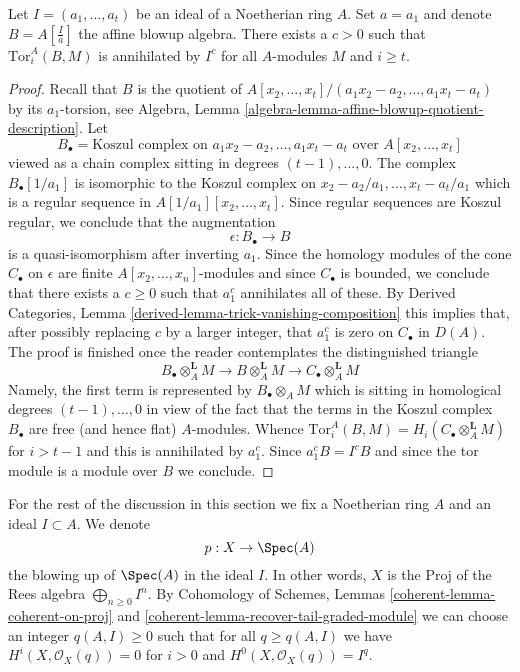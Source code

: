 \begin{lemma}
\label{lemma-annihilates-affine}
Let $I = (a_1, \ldots, a_t)$ be an ideal of a Noetherian ring $A$.
Set $a = a_1$ and denote $B = A[\frac{I}{a}]$ the affine blowup algebra.
There exists a $c > 0$ such that $\text{Tor}_i^A(B, M)$ is annihilated
by $I^c$ for all $A$-modules $M$ and $i \geq t$.
\end{lemma}

\begin{proof}
Recall that $B$ is the quotient of
$A[x_2, \ldots, x_t]/(a_1x_2 - a_2, \ldots, a_1x_t - a_t)$
by its $a_1$-torsion, see
Algebra, Lemma \ref{algebra-lemma-affine-blowup-quotient-description}. Let
$$
B_\bullet = \text{Koszul complex on }a_1x_2 - a_2, \ldots, a_1x_t - a_t
\text{ over }A[x_2, \ldots, x_t]
$$
viewed as a chain complex sitting in degrees $(t - 1), \ldots, 0$.
The complex $B_\bullet[1/a_1]$ is isomorphic to the Koszul complex
on $x_2 - a_2/a_1, \ldots, x_t - a_t/a_1$ which is a regular sequence
in $A[1/a_1][x_2, \ldots, x_t]$. Since regular sequences are
Koszul regular, we conclude that the augmentation
$$
\epsilon : B_\bullet \longrightarrow B
$$
is a quasi-isomorphism after inverting $a_1$. Since the homology modules
of the cone $C_\bullet$ on $\epsilon$ are finite $A[x_2, \ldots, x_n]$-modules
and since $C_\bullet$ is bounded,
we conclude that there exists a $c \geq 0$ such that $a_1^c$
annihilates all of these. By
Derived Categories, Lemma \ref{derived-lemma-trick-vanishing-composition}
this implies that, after possibly replacing $c$ by a larger integer,
that $a_1^c$ is zero on $C_\bullet$ in $D(A)$.
The proof is finished once the reader contemplates
the distinguished triangle
$$
B_\bullet \otimes_A^\mathbf{L} M \to
B \otimes_A^\mathbf{L} M \to
C_\bullet \otimes_A^\mathbf{L} M
$$
Namely, the first term is represented by $B_\bullet \otimes_A M$ which
is sitting in homological degrees $(t - 1), \ldots, 0$
in view of the fact that the terms in the Koszul complex $B_\bullet$
are free (and hence flat) $A$-modules. Whence
$\text{Tor}_i^A(B, M) = H_i(C_\bullet \otimes_A^\mathbf{L} M)$
for $i > t - 1$ and this is annihilated by $a_1^c$.
Since $a_1^cB = I^cB$ and since the tor module is a module
over $B$ we conclude.
\end{proof}

\noindent
For the rest of the discussion in this section we fix a Noetherian ring $A$
and an ideal $I \subset A$. We denote
$$
p : X \to \Spec(A)
$$
the blowing up of $\Spec(A)$ in the ideal $I$. In other words, $X$ is the
$\text{Proj}$ of the Rees algebra $\bigoplus_{n \geq 0} I^n$.
By Cohomology of Schemes, Lemmas \ref{coherent-lemma-coherent-on-proj} and
\ref{coherent-lemma-recover-tail-graded-module}
we can choose an integer $q(A, I) \geq 0$ such that for all $q \geq q(A, I)$
we have $H^i(X, \mathcal{O}_X(q)) = 0$ for
$i > 0$ and $H^0(X, \mathcal{O}_X(q)) = I^q$.

